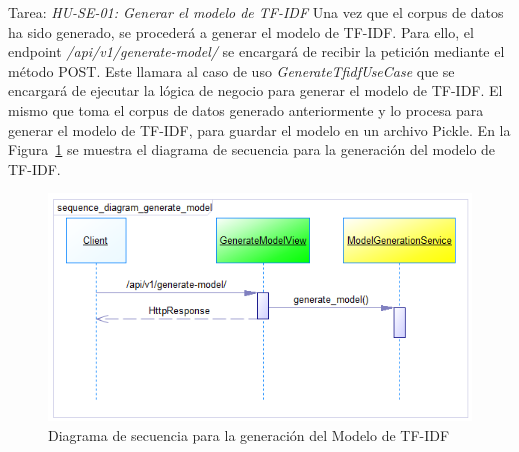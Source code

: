 Tarea: \textit{HU-SE-01: Generar el modelo de TF-IDF}
Una vez que el corpus de datos ha sido generado, se procederá a generar el modelo de TF-IDF.
Para ello, el endpoint \textit{/api/v1/generate-model/} se encargará de recibir la petición mediante el método POST.
Este llamara al caso de uso \textit{GenerateTfidfUseCase} que se encargará de ejecutar la lógica de negocio para generar el modelo de TF-IDF.
El mismo que toma el corpus de datos generado anteriormente y lo procesa para generar el modelo de TF-IDF, para guardar el modelo en un archivo Pickle.
En la Figura~\ref{fig:sequence-diagram-generate-tfidf} se muestra el diagrama de secuencia para la generación del modelo de TF-IDF.

\begin{figure}[H]
    \centering
    \includegraphics[scale=0.7]{../02Figures/02Chapter/Sprints/Sprint-4/sequence_diagram_generate_model.png}
    \caption{Diagrama de secuencia para la generación del Modelo de TF-IDF}\label{fig:sequence-diagram-generate-tfidf}
\end{figure}

